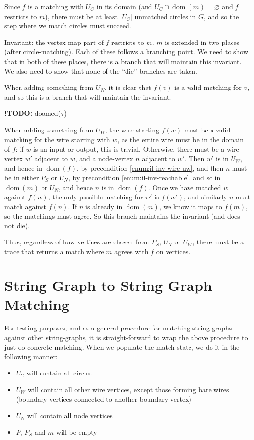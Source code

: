 \documentclass{article}
\DeclareMathOperator{\dom}{dom}
\newcommand{\TODOinline}[1]{%
\typeout{WARNING!!! there is still a TODO left}
{\color{blue}\textbf{!TODO: }#1}
}
\begin{document}
Since $f$ is a matching with $U_C$ in its domain (and $U_C\cap\dom(m) = \varnothing$ and $f$ restricts to $m$), there must be at least $|U_C|$ unmatched circles in $G$, and so the step where we match circles must succeed.

Invariant: the vertex map part of $f$ restricts to $m$.  $m$ is extended in two places (after circle-matching).  Each of these follows a branching point.  We need to show that in both of these places, there is a branch that will maintain this invariant.  We also need to show that none of the ``die'' branches are taken.

When adding something from $U_N$, it is clear that $f(v)$ is a valid matching for $v$, and so this is a branch that will maintain the invariant.

\TODOinline{doomed(v)}

When adding something from $U_W$, the wire starting $f(w)$ must be a valid matching for the wire starting with $w$, as the entire wire must be in the domain of $f$: if $w$ is an input or output, this is trivial.  Otherwise, there must be a wire-vertex $w'$ adjacent to $w$, and a node-vertex $n$ adjacent to $w'$.  Then $w'$ is in $U_W$, and hence in $\dom(f)$, by precondition \ref{enum:il-inv-wire-uw}, and then $n$ must be in either $P_S$ or $U_N$, by precondition \ref{enum:il-inv-reachable}, and so in $\dom(m)$ or $U_N$, and hence $n$ is in $\dom(f)$.  Once we have matched $w$ against $f(w)$, the only possible matching for $w'$ is $f(w')$, and similarly $n$ must match against $f(n)$.  If $n$ is already in $\dom(m)$, we know it maps to $f(m)$, so the matchings must agree.  So this branch maintains the invariant (and does not die).

Thus, regardless of how vertices are chosen from $P_S$, $U_N$ or $U_W$, there must be a trace that returns a match where $m$ agrees with $f$ on vertices.


\section{String Graph to String Graph Matching}
\label{sec:test-wrapper}

For testing purposes, and as a general procedure for matching string-graphs against other string-graphs, it is straight-forward to wrap the above procedure to just do concrete matching.  When we populate the match state, we do it in the following manner:
\begin{itemize}
\item $U_C$ will contain all circles
\item $U_W$ will contain all other wire vertices, except those forming bare wires (boundary vertices connected to another boundary vertex)
\item $U_N$ will contain all node vertices
\item $P$, $P_S$ and $m$ will be empty
\end{itemize}
\end{document}
